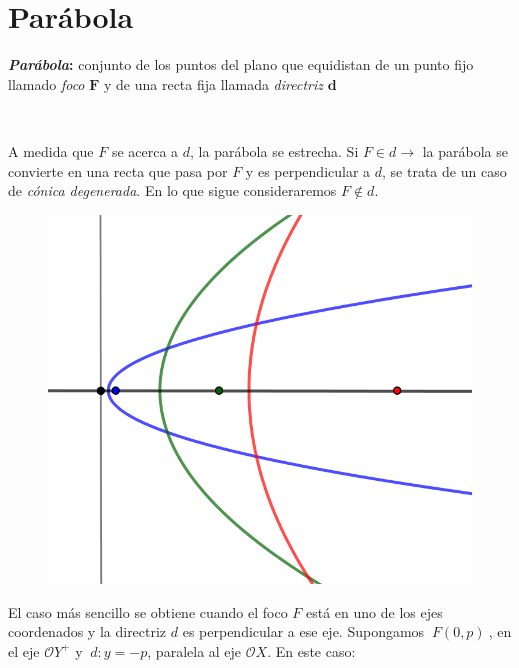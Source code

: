 \vspace{10mm}
\section{Parábola}
\vspace{-5mm}
\vspace{0.5cm}


\vspace{5mm}
\begin{definition}[ Parábola]
	
	\textbf{\emph{Parábola}:} conjunto de los puntos del plano  que equidistan de un punto fijo llamado \emph{foco} $\boldsymbol F$ y de una recta fija llamada \emph{directriz} $\boldsymbol d$	
\end{definition}

\vspace{5mm}
\begin{multicols}{2}
$\quad$

A medida que $F$ se acerca a $d$, la parábola se estrecha. Si $F\in d \to $ la parábola se convierte en una recta que pasa por $F$ y es perpendicular a $d$, se trata de un caso de \emph{cónica degenerada}. En lo que sigue consideraremos $F \notin d$.
\begin{figure}[H]
	\centering
	\includegraphics[width=.3\textwidth]{img-conicas/conicas02.png}
	\end{figure}	
\end{multicols}

El caso más sencillo se obtiene cuando el foco $F$ está en uno de los ejes coordenados y la directriz $d$ es perpendicular a ese eje. Supongamos $\ F(0,p)\ $, en el eje $\mathcal OY^+$ y $\ d:y=-p$, paralela al eje $\mathcal OX$. En este caso:

